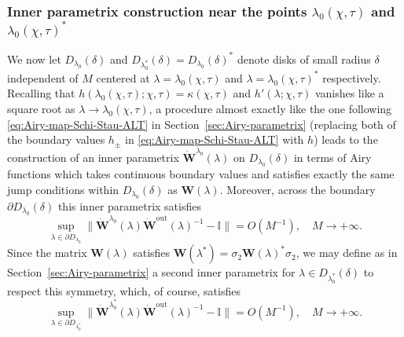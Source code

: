
\subsubsection{Inner parametrix construction near the points $\lambda_0(\chi,\tau)$ and $\lambda_0(\chi,\tau)^*$} We now let $D_{\lambda_0}(\delta)$ and $D_{\lambda_0^*}(\delta) = D_{\lambda_0}(\delta)^*$ denote disks of small radius $\delta$ independent of $M$ centered at $\lambda=\lambda_0(\chi,\tau)$ and $\lambda=\lambda_0(\chi,\tau)^*$ respectively. Recalling that $h(\lambda_0(\chi,\tau);\chi,\tau) = \kappa(\chi,\tau)$ and $h'(\lambda;\chi,\tau)$ vanishes like a square root as $\lambda\to\lambda_0(\chi,\tau)$, a procedure almost exactly like the one following \eqref{eq:Airy-map-Schi-Stau-ALT} in Section~\ref{sec:Airy-parametrix} (replacing both of the boundary values $h_\pm$ in \eqref{eq:Airy-map-Schi-Stau-ALT} with $h$) leads to the construction of an inner parametrix $\dot{\mathbf{W}}^{\lambda_0}(\lambda)$ on $D_{\lambda_0}(\delta)$ in terms of Airy functions which takes continuous boundary values and satisfies exactly the same jump conditions within $D_{\lambda_0}(\delta)$ as $\mathbf{W}(\lambda)$. Moreover, across the boundary $\partial D_{\lambda_0}(\delta)$ this inner parametrix satisfies
\begin{equation}
\sup_{\lambda \in \partial D_{\lambda_0} } \| \dot{\mathbf{W}}^{\lambda_0}(\lambda)\dot{\mathbf{W}}^{\mathrm{out}}(\lambda)^{-1} -\mathbb{I} \| = O(M^{-1}),\quad M\to+\infty.
\label{eq:error-Airy-disk-plus}
\end{equation}
Since the matrix $\mathbf{W}(\lambda)$ satisfies $\mathbf{W}(\lambda^*)=\sigma_2\mathbf{W}(\lambda)^*\sigma_2$, we may define as in Section~\ref{sec:Airy-parametrix} a second inner parametrix for $\lambda\in D_{\lambda_0^*}(\delta)$ to respect this symmetry, which, of course, satisfies
\begin{equation}
\sup_{\lambda \in \partial D_{\lambda_0^*} } \| \dot{\mathbf{W}}^{\lambda_0^*}(\lambda)\dot{\mathbf{W}}^{\mathrm{out}}(\lambda)^{-1} -\mathbb{I} \| = O(M^{-1}),\quad M\to+\infty.
\label{eq:error-Airy-disk-minus}
\end{equation}

